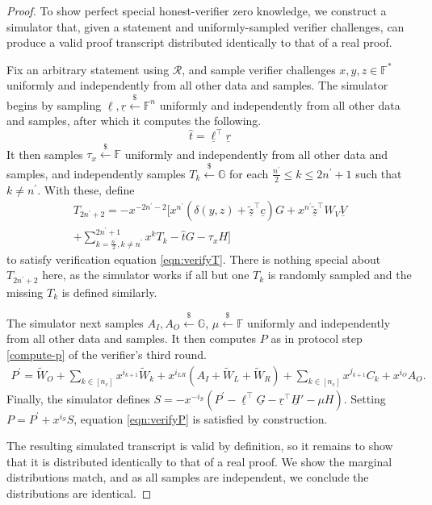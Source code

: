 \documentclass{article}
\theoremstyle{definition}
\newcommand{\samp}{\mathrel{\overset{\$}{\leftarrow}}}
\newcommand{\GG}{\mathbb{G}}
\newcommand{\FF}{\mathbb{F}}
\newcommand{\zq}{\widetilde{\underline{z}}}
\begin{document}
\begin{proof}
To show perfect special honest-verifier zero knowledge, we construct a simulator that, given a statement and uniformly-sampled verifier challenges, can produce a valid proof transcript distributed identically to that of a real proof.

Fix an arbitrary statement using $\mathcal{R}$, and sample verifier challenges $x, y, z \in \FF^*$ uniformly and independently from all other data and samples. The simulator begins by sampling $\underline{\ell}, \underline{r} \samp \FF^n$ uniformly and independently from all other data and samples, after which it computes the following.
$$\widehat{t} =  \underline{\ell}^\top\underline{r}$$
It then samples $\tau_x \samp \FF$ uniformly and independently from all other data and samples, and independently samples $T_k \samp \GG$ for each $\frac{n^\prime}{2} \leq k \leq 2n^\prime + 1$ such that $k \neq n^\prime$. With these, define
\begin{multline*}
T_{2n^\prime + 2} = -x^{-2n^\prime-2} \Biggl[ x^{n^\prime}\left( \delta(y, z) + \zq^\top\underline{c}  \right)G + x^{n^\prime} \zq^\top W_V \underline{V} \\
+ \sum_{k=\frac{n^\prime}{2}, k \neq n^\prime}^{2n^\prime + 1} x^k T_k - \widehat{t} G - \tau_x H \Biggr]
\end{multline*}
to satisfy verification equation \ref{eqn:verifyT}. There is nothing special about $T_{2n^\prime+2}$ here, as the simulator works if all but one $T_k$ is randomly sampled and the missing $T_k$ is defined similarly.

The simulator next samples $A_I, A_O \samp \GG$, $\mu \samp \FF$ uniformly and independently from all other data and samples. It then computes $P$ as in protocol step \ref{compute-p} of the verifier's third round.
\begin{multline*}
P^\prime = \widetilde{W}_O + \sum_{k \in [n_c]} x^{i_{k+1}} \widetilde{W}_k + x^{i_{LR}}(A_I + \widetilde{W}_L + \widetilde{W}_R)  + \sum_{k\in [n_c]} x^{j_{k+1}}C_k + x^{i_O}A_O.
\end{multline*}
Finally, the simulator defines $S = -x^{-i_S}(P^\prime - \underline{\ell}^\top \underline{G} - \underline{r}^\top \underline{H}' - \mu H)$. Setting $P = P^\prime + x^{i_S}S$, equation \ref{eqn:verifyP} is satisfied by construction.

The resulting simulated transcript is valid by definition, so it remains to show that it is distributed identically to that of a real proof. We show the marginal distributions match, and as all samples are independent, we conclude the distributions are identical. 


\end{proof}
\end{document}
